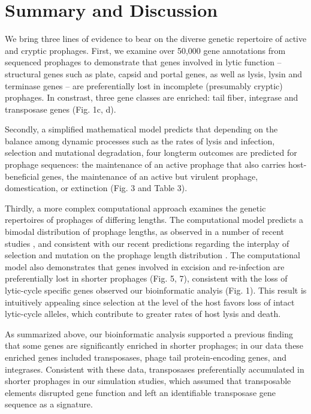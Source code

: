  \section{Summary and Discussion}
 
 We bring three lines of evidence to bear on the diverse genetic repertoire of active and cryptic prophages.  First, we examine over 50,000 gene annotations from sequenced prophages to demonstrate that genes involved in lytic function -- structural genes such as plate, capsid and portal genes, as well as lysis, lysin and terminase genes -- are preferentially lost in incomplete (presumably cryptic) prophages.  In constrast, three gene classes are enriched: tail fiber, integrase and transposase genes (Fig. 1c, d).
 
 Secondly, a simplified mathematical model predicts that depending on the balance among dynamic processes such as the rates of lysis and infection, selection and mutational degradation, four longterm outcomes are predicted for prophage sequences: the maintenance of an active prophage that also carries host-beneficial genes, the maintenance of an active but virulent prophage, domestication, or extinction (Fig. 3 and Table 3).
 
 Thirdly, a more complex computational approach examines the genetic repertoires of prophages of differing lengths.  The computational model predicts a bimodal distribution of prophage lengths, as observed in a number of recent studies \cite{bobay_pervasive_2014, leplae_aclame:_2010, brueggemann_pneumococcal_2017, crispim_screening_2018}, and consistent with our recent predictions regarding the interplay of selection and mutation on the prophage length distribution \cite{khan_quantifying_2019}.  The computational model also demonstrates that genes involved in excision and re-infection are preferentially lost in shorter prophages (Fig. 5, 7), consistent with the loss of lytic-cycle specific genes observed our bioinformatic analyis (Fig. 1).  This result is intuitively appealing since selection at the level of the host favors loss of intact lytic-cycle alleles, which contribute to greater rates of host lysis and death.  
 
 As summarized above, our bioinformatic analysis supported a previous finding \cite{bobay_pervasive_2014} that some genes are significantly enriched in shorter prophages; in our data these enriched genes included transposases, phage tail protein-encoding genes, and integrases.  Consistent with these data, transposases preferentially accumulated in shorter prophages in our simulation studies, which assumed that transposable elements disrupted gene function and left an identifiable transposase gene sequence as a signature.
 
